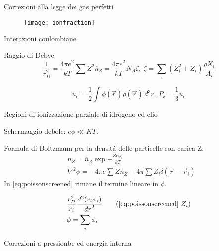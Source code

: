 \begin{frame}{Correzioni alla legge dei gas perfetti}

\begin{figure}
        \texttt{[image: ionfraction]}\label{ionfraction}
\end{figure}%

\begin{block}{Interazioni coulombiane} 

Raggio di Debye:
\begin{equation}
\frac{1}{r_D^2}=\frac{4\pi e^2}{kT}\sum Z^2\overline{n}_Z=\frac{4\pi e^2}{kT}N_A\zeta,\ \zeta=\sum_{i}(Z_i^2+Z_i)\frac{\rho X_i}{A_i}\label{eq:debyeradius}
\end{equation}

\begin{equation}
u_c=\frac{1}{2}\int\phi(\vec{r})\rho(\vec{r})\,d^3r,\ P_c=\frac{1}{3}u_c
\end{equation}

Regioni di ionizzazione parziale di idrogeno ed elio


\end{block}

\begin{block}{Schermaggio debole: $e\phi\ll KT$.}




Formula di Boltzmann per la densit\'a delle particelle con carica Z:
\begin{align}
&n_Z=\overline{n}_Z\exp{-\frac{Ze\phi_i}{kT}}\\
&\nabla^2\phi=-4\pi e\sum Zn_Z-4\pi\sum Z_i\delta(\vec{r}-\vec{r}_i)\label{eq:poissonscreened}
\end{align}
In \eqref{eq:poissonscreened} rimane il termine lineare in $\phi$.





\begin{align}
&\frac{r_D^2}{r_i}\TtwoDy{r}{(r_i\phi_i)}\tag{\ref{eq:poissonscreened} $Z_i$}\\
&\phi=\sum_i\phi_i
\end{align}

\end{block}

\begin{block}{Correzioni a pressionbe ed energia interna}


\end{block}
\end{frame}
